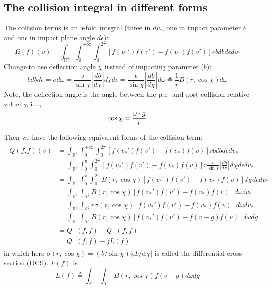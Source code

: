 \documentclass[11pt]{amsart}
\begin{document}
\subsection{The collision integral in different forms}
 The collision terms is an 5-fold integral (three in $dv_*$, one in impact parameter $b$ and one in impact plane angle $d\epsilon$):
\begin{equation}
\Omega(f)(v) 
=  \int_{\mathbb{R}^3} \int_0^{+\infty} \int_0^{2\pi} [f(v_*')f(v')-f(v_*)f(v')] r bdbd\epsilon dv_* 
\end{equation}
Change to use deflection angle $\chi$ instead of impacting parameter ($b$):
\begin{equation}
bdbd\epsilon =  \sigma d\omega  = \frac{b}{\sin\chi}\left|\frac{db}{d\chi}\right|d\chi d\epsilon 
		   = \frac{b}{\sin \chi} \left|\frac{db}{d\chi}\right|d\omega 
		   \triangleq  \frac{1}{r} {B}(r,\cos\chi) d\omega
\end{equation}
Note, the deflection angle is the angle between the pre- and post-collision relative velocity, i.e.,
\begin{equation}
\cos \chi = {\omega \cdot g \over r}
\end{equation}

Then we have the following equivalent forms of the collision term:
\begin{align}
\begin{split}
Q(f,f)(v) 
&=  \int_{\mathbb{R}^3} \int_0^{+\infty} \int_0^{2\pi} [f(v_*')f(v')-f(v_*)f(v)] r bdbd\epsilon dv_* \\
&=  \int_{\mathbb{R}^3} \int_0^{\pi} \int_0^{2\pi} [f(v_*')f(v')-f(v_*)f(v)] r \frac{b}{\sin \chi} \left|\frac{db}{d\chi} \right| d\chi d\epsilon dv_* \\
&=  \int_{\mathbb{R}^3} \int_0^{\pi} \int_0^{2\pi} {B}(r,\cos\chi)[f(v_*')f(v')-f(v_*)f(v)] d\chi d\epsilon dv_* \\
&=  \int_{\mathbb{R}^3} \int_{\mathcal{S}^2} {B}(r,\cos\chi)[f(v_*')f(v')-f(v_*)f(v)] d\omega dv_* \\
&=  \int_{\mathbb{R}^3} \int_{\mathcal{S}^2} r \sigma(r,\cos\chi)[f(v_*')f(v')-f(v_*)f(v)] d\omega dv_* \\
&=  \int_{\mathbb{R}^3} \int_{\mathcal{S}^2} {B}(r,\cos\chi)[f(v_*')f(v')-f(v-g)f(v)]d\omega dg \\
& = Q^{+}(f,f) - Q^{-}(f,f) \\
& = Q^{+}(f,f) - fL(f)
\end{split}
\end{align}
in which here $\sigma(r,\cos\chi) = (b/\sin \chi) |\text{d} b/\text{d} \chi|$ is called the differential cross-section (DCS). $L(f)$ is
\begin{equation}
L(f) \triangleq \int_{\mathbb{R}^3} \int_{\mathcal{S}^2} {B}(r,\cos\chi)f(v-g)d\omega dg
\end{equation}
\end{document}
